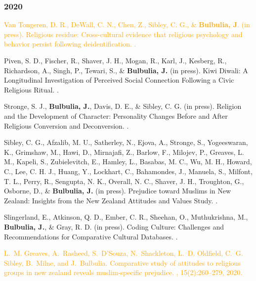 \documentclass{article}
\begin{document}
\begin{thebibliography}{99}
\subsubsection*{2020}

 \textcolor{Orange}{Van Tongeren, D. R., DeWall, C. N., Chen, Z., Sibley, C. G., \& {\bf Bulbulia, J}. (in press). 
\newblock Religious residue: Cross-cultural evidence that religious psychology and behavior persist following deidentification. 
.}


 Piven, S. D., Fischer, R., Shaver, J. H., Mogan, R., Karl, J., Kesberg, R., Richardson, A., Singh, P., Tewari, S., \& {\bf Bulbulia, J.} (in press).
\newblock Kiwi Diwali: A Longitudinal Investigation of Perceived Social Connection Following a Civic Religious Ritual.
.

 Stronge, S. J., {\bf Bulbulia, J.}, Davis, D. E., \& Sibley, C. G. (in press). 
\newblock Religion and the Development of Character: Personality Changes Before and After Religious Conversion and Deconversion. 
.


 Sibley, C. G., Afzalib, M. U., Satherley, N., Ejova, A., Stronge, S., Yogeeswaran, K., Grimshaw, M., Hawi, D., Mirnajafi, Z., Barlow, F., Milojev, P., Greaves, L. M., Kapeli, S., Zubielevitch, E., Hamley, L., Basabas, M. C., Wu, M. H., Howard, C., Lee, C. H. J., Huang, Y., Lockhart, C., Bahamondes, J., Manuela, S., Milfont, T. L., Perry, R., Sengupta, N. K., Overall, N. C., Shaver, J. H., Troughton, G., Osborne, D., \& {\bf Bulbulia, J.} (in press). 
\newblock Prejudice toward Muslims in New Zealand: Insights from the New Zealand Attitudes and Values Study.
.


 Slingerland, E., Atkinson, Q. D., Ember, C. R., Sheehan, O., Muthukrishna, M., {\bf Bulbulia, J.}, \& Gray, R. D. (in press). 
\newblock Coding Culture: Challenges and Recommendations for Comparative Cultural Databases.
. 


\textcolor{Orange}{L.~M. Greaves, A.~Rasheed, S.~D'Souza, N.~Shackleton, L.~D. Oldfield, C.~G.
  Sibley, B.~Milne, and J.~Bulbulia.
\newblock Comparative study of attitudes to religious groups in new zealand
  reveals muslim-specific prejudice.
,
  15(2):260--279, 2020.}




\end{thebibliography}
\end{document}
